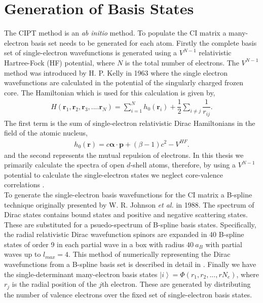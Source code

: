 \documentclass[10pt,a4paper, twoside, openright]{report}
\begin{document}
\section{Generation of Basis States} \label{sec:HF}
The CIPT method is an \textit{ab initio} method. To populate the CI matrix a many-electron basis set needs to be generated for each atom. Firstly the complete basis set of single-electron wavefunctions is generated using a $V^{N-1}$ relativistic Hartree-Fock (HF) potential, where $N$ is the total number of electrons. The $V^{N-1}$ method was introduced by H. P. Kelly in 1963 \cite{Kelly1963_1, Kelly1964} where the single electron wavefunctions are calculated in the potential of the singularly charged frozen core.  The Hamiltonian which is used for this calculation is given by,
\begin{align}
H\left(\textbf{r}_1,\textbf{r}_2, \textbf{r}_3, .... \textbf{r}_N\right) = \sum_{i=1}^{N} h_0\left(\textbf{r}_i\right) + \dfrac{1}{2}\sum_{i\neq j}\dfrac{1}{r_{ij}}.
\end{align}
The first term is the sum of single-electron relativistic Dirac Hamiltonians in the field of the atomic nucleus,
\begin{align*}
h_0\left(\textbf{r}\right) = c \boldsymbol{\alpha}\cdot\textbf{p} + (\beta - 1) c^2 - V^{HF}.
\end{align*}
and the second represents the mutual repulsion of electrons.   In this thesis we primarily calculate the spectra of open $d$-shell atoms, therefore, by using a $V^{N-1}$ potential to calculate the single-electron states we neglect core-valence correlations \cite{DBHF2017}. \\
\linebreak
To generate the single-electron basis wavefunctions for the CI matrix a  B-spline technique originally presented by W. R. Johnson \textit{et al.} in 1988\cite{Johnson1988}. The spectrum of Dirac states contains bound states and positive and negative scattering states. These are substituted for a psuedo-spectrum of B-spline basis states. Specifically, the radial relativistic Dirac wavefunction spinors are expanded in  40 B-spline states of order 9 in each partial wave in a box with radius $40 \ a_B$ with partial waves up to $l_{max}=4$. This method of numerically representing the Dirac wavefunctions from a B-spline basis set is described in detail in \cite{JohnsonAST}.  Finally we have the single-determinant many-electron basis states $\left|i\right> = \Phi\left(r_1, r_2, ... , r{N_e}\right)$, where $r_j$ is the radial position of the $j$th electron. These are generated by distributing the number of valence electrons over the fixed set of single-electron basis states.
\end{document}
